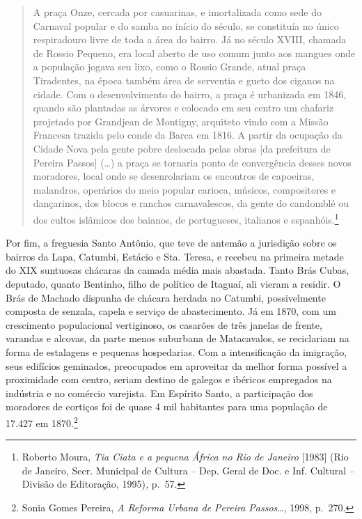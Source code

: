 \begin{quote}
A praça Onze, cercada por casuarinas, e imortalizada como sede do
Carnaval popular e do samba no início do século, se constituía no único
respiradouro livre de toda a área do bairro. Já no século XVIII, chamada
de Rossio Pequeno, era local aberto de uso comum junto aos mangues onde
a população jogava seu lixo, como o Rossio Grande, atual praça
Tiradentes, na época também área de serventia e gueto dos ciganos na
cidade. Com o desenvolvimento do bairro, a praça é urbanizada em 1846,
quando são plantadas as árvores e colocado em seu centro um chafariz
projetado por Grandjean de Montigny, arquiteto vindo com a Missão
Francesa trazida pelo conde da Barca em 1816. A partir da ocupação da
Cidade Nova pela gente pobre deslocada pelas obras {[}da prefeitura de
Pereira Passos{]} (\ldots{}) a praça se tornaria ponto de convergência
desses novos moradores, local onde se desenrolariam os encontros de
capoeiras, malandros, operários do meio popular carioca, músicos,
compositores e dançarinos, dos blocos e ranchos carnavalescos, da gente
do candomblé ou dos cultos islâmicos dos baianos, de portugueses,
italianos e espanhóis.\footnote{Roberto Moura, \emph{Tia Ciata e a
  pequena África no Rio de Janeiro} {[}1983{]} (Rio de Janeiro, Secr.
  Municipal de Cultura -- Dep. Geral de Doc. e Inf. Cultural -- Divisão
  de Editoração, 1995)\emph{,} p.~57.}
\end{quote}

Por fim, a freguesia Santo Antônio, que teve de antemão a jurisdição
sobre os bairros da Lapa, Catumbi, Estácio e Sta. Teresa, e recebeu na
primeira metade do XIX suntuosas chácaras da camada média mais abastada.
Tanto Brás Cubas, deputado, quanto Bentinho, filho de político de
Itaguaí, ali vieram a residir. O Brás de Machado dispunha de chácara
herdada no Catumbi, possivelmente composta de senzala, capela e serviço
de abastecimento. Já em 1870, com um crescimento populacional
vertiginoso, os casarões de três janelas de frente, varandas e alcovas,
da parte menos suburbana de Matacavalos, se reciclariam na forma de
estalagens e pequenas hospedarias. Com a intensificação da imigração,
seus edifícios geminados, preocupados em aproveitar da melhor forma
possível a proximidade com centro, seriam destino de galegos e ibéricos
empregados na indústria e no comércio varejista. Em Espírito Santo, a
participação dos moradores de cortiços foi de quase 4 mil habitantes
para uma população de 17.427 em 1870.\footnote{Sonia Gomes Pereira,
  \emph{A Reforma Urbana de Pereira Passos}\ldots{}, 1998, p.~270.}

